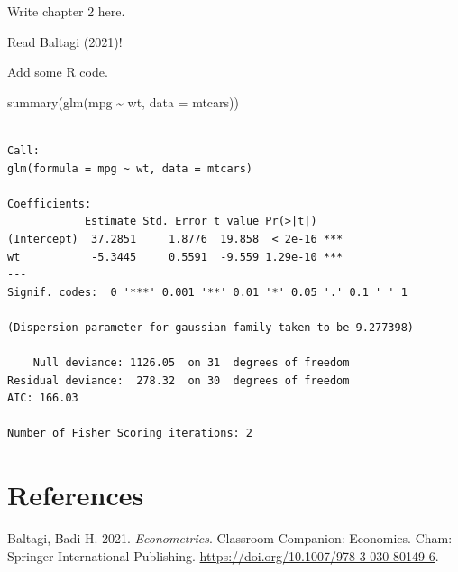 \documentclass[letterpaper, 11pt, oneside]{scrbook}
\newenvironment{CSLReferences}[2]
  {}
  {\par}
\newenvironment{Shaded}{\begin{snugshade}}{\end{snugshade}}
\newcommand{\AttributeTok}[1]{\textcolor[rgb]{0.77,0.63,0.00}{#1}}
\newcommand{\FunctionTok}[1]{\textcolor[rgb]{0.00,0.00,0.00}{#1}}
\newcommand{\NormalTok}[1]{#1}
\newcommand{\SpecialCharTok}[1]{\textcolor[rgb]{0.00,0.00,0.00}{#1}}
\begin{document}
  Write chapter 2 here.

  Read Baltagi (2021)!

  Add some R code.

\begin{Shaded}
\begin{Highlighting}[]
\FunctionTok{summary}\NormalTok{(}\FunctionTok{glm}\NormalTok{(mpg }\SpecialCharTok{\textasciitilde{}}\NormalTok{ wt, }\AttributeTok{data =}\NormalTok{ mtcars))}
\end{Highlighting}
\end{Shaded}

\begin{verbatim}

Call:
glm(formula = mpg ~ wt, data = mtcars)

Coefficients:
            Estimate Std. Error t value Pr(>|t|)    
(Intercept)  37.2851     1.8776  19.858  < 2e-16 ***
wt           -5.3445     0.5591  -9.559 1.29e-10 ***
---
Signif. codes:  0 '***' 0.001 '**' 0.01 '*' 0.05 '.' 0.1 ' ' 1

(Dispersion parameter for gaussian family taken to be 9.277398)

    Null deviance: 1126.05  on 31  degrees of freedom
Residual deviance:  278.32  on 30  degrees of freedom
AIC: 166.03

Number of Fisher Scoring iterations: 2
\end{verbatim}

  \hypertarget{references}{%
  \chapter*{References}\label{references}}

  \hypertarget{refs}{}
  \begin{CSLReferences}{1}{0}
  \leavevmode{}%
  Baltagi, Badi H. 2021. \emph{Econometrics}. Classroom {Companion}:
  {Economics}. Cham: Springer International Publishing.
  \url{https://doi.org/10.1007/978-3-030-80149-6}.

  \end{CSLReferences}
  
  \appendix
\end{document}
